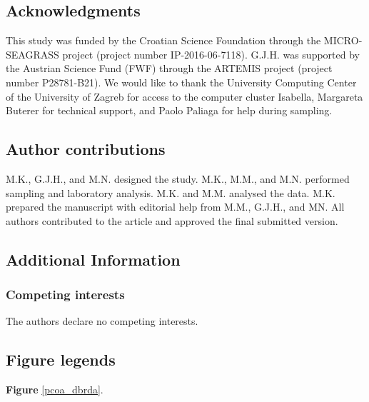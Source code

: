 \documentclass[
  12pt,
]{article}
\begin{document}
\newpage

\hypertarget{acknowledgments}{%
\subsection{Acknowledgments}\label{acknowledgments}}

This study was funded by the Croatian Science Foundation through the
MICRO-SEAGRASS project (project number IP-2016-06-7118). G.J.H. was
supported by the Austrian Science Fund (FWF) through the ARTEMIS project
(project number P28781-B21). We would like to thank the University
Computing Center of the University of Zagreb for access to the computer
cluster Isabella, Margareta Buterer for technical support, and Paolo
Paliaga for help during sampling.

\hypertarget{author-contributions}{%
\subsection{Author contributions}\label{author-contributions}}

M.K., G.J.H., and M.N. designed the study. M.K., M.M., and M.N.
performed sampling and laboratory analysis. M.K. and M.M. analysed the
data. M.K. prepared the manuscript with editorial help from M.M.,
G.J.H., and MN. All authors contributed to the article and approved the
final submitted version.

\hypertarget{additional-information}{%
\subsection{Additional Information}\label{additional-information}}

\hypertarget{competing-interests}{%
\subsubsection{Competing interests}\label{competing-interests}}

The authors declare no competing interests.

\newpage

\hypertarget{figure-legends}{%
\subsection{Figure legends}\label{figure-legends}}

\setlength\parindent{0pt}

\textbf{Figure} \ref{pcoa_dbrda}. 
\end{document}
